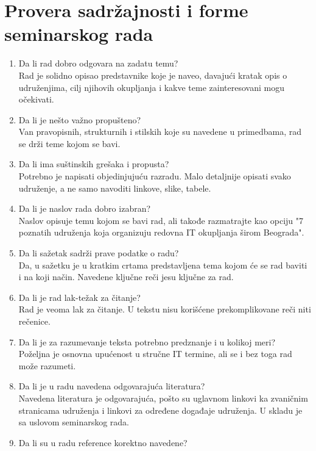 \documentclass[a4paper]{report}
\begin{document}
\section{Provera sadržajnosti i forme seminarskog rada}

\begin{enumerate}
\item Da li rad dobro odgovara na zadatu temu?\\
Rad je solidno opisao predstavnike koje je naveo, davajući kratak opis o udruženjima,
cilj njihovih okupljanja i kakve teme zainteresovani mogu očekivati. 
\item Da li je nešto važno propušteno?\\
Van pravopisnih, strukturnih i stilskih koje su navedene u primedbama, 
rad se drži teme kojom se bavi.
\item Da li ima suštinskih grešaka i propusta?\\
Potrebno je napisati objedinjujuću razradu. Malo detaljnije opisati 
svako udruženje, a ne samo navoditi linkove, slike, tabele.
\item Da li je naslov rada dobro izabran?\\
Naslov opisuje temu kojom se bavi rad, ali takođe razmatrajte kao 
opciju "7 poznatih udruženja koja organizuju redovna IT 
okupljanja širom Beograda".
\item Da li sažetak sadrži prave podatke o radu?\\
Da, u sažetku je u kratkim crtama predstavljena tema kojom će se
rad baviti i na koji način. Navedene ključne reči jesu ključne za rad.
\item Da li je rad lak-težak za čitanje?\\
Rad je veoma lak za čitanje. U tekstu nisu korišćene prekomplikovane reči niti rečenice.
\item Da li je za razumevanje teksta potrebno predznanje i u kolikoj meri?\\
Poželjna je osnovna upućenost u stručne IT termine, ali se i bez toga rad može razumeti.
\item Da li je u radu navedena odgovarajuća literatura?\\
Navedena literatura je odgovarajuća, pošto su uglavnom linkovi ka zvaničnim stranicama
udruženja i linkovi za određene događaje udruženja. U skladu je sa uslovom seminarskog rada. 
\item Da li su u radu reference korektno navedene?\\

\end{enumerate}
\end{document}
